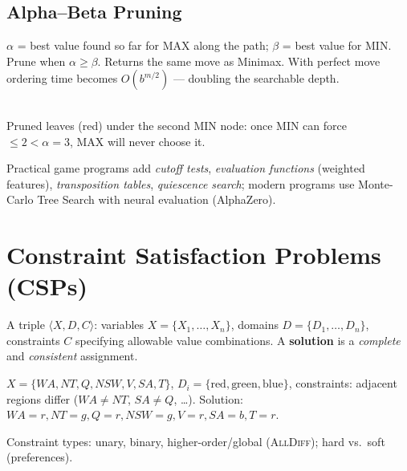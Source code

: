 \subsection{Alpha--Beta Pruning}
$\alpha$ = best value found so far for MAX along the path; $\beta$ = best value for MIN. Prune when $\alpha\ge\beta$. Returns the same move as Minimax. With perfect move ordering time becomes $O(b^{m/2})$ --- doubling the searchable depth.
\begin{center}
\\[2pt]{\small Pruned leaves (red) under the second MIN node: once MIN can force $\le2<\alpha=3$, MAX will never choose it.}
\end{center}
Practical game programs add \emph{cutoff tests}, \emph{evaluation functions} (weighted features), \emph{transposition tables}, \emph{quiescence search}; modern programs use Monte-Carlo Tree Search with neural evaluation (AlphaZero).

\section{Constraint Satisfaction Problems (CSPs)}
\begin{definition}[CSP]
A triple $\langle X, D, C\rangle$: variables $X=\{X_1,\dots,X_n\}$, domains $D=\{D_1,\dots,D_n\}$, constraints $C$ specifying allowable value combinations. A \textbf{solution} is a \emph{complete} and \emph{consistent} assignment.
\end{definition}
\begin{example}
$X=\{WA,NT,Q,NSW,V,SA,T\}$, $D_i=\{\text{red},\text{green},\text{blue}\}$, constraints: adjacent regions differ ($WA\ne NT$, $SA\ne Q$, \dots). Solution: $WA{=}r, NT{=}g, Q{=}r, NSW{=}g, V{=}r, SA{=}b, T{=}r$.
\end{example}
Constraint types: unary, binary, higher-order/global (\textsc{AllDiff}); hard vs.\ soft (preferences).


